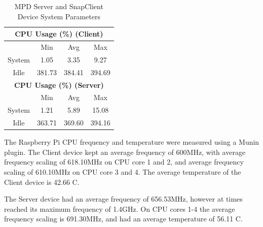 \documentclass[11pt,a4paper]{scrreprt}
\begin{document}
\begin{table}[H]
\begin{tabular}{||c|c|c|c|c|c|c||}
    \multicolumn{7}{|c|}{\textbf{CPU Usage (\%) (Client)}} \\
    \hline\hline
      & \multicolumn{2}{|c|}{Min} & \multicolumn{2}{|c|}{Avg} & \multicolumn{2}{|c|}{Max} \\
    \hline
    System & \multicolumn{2}{|c|}{1.05} & \multicolumn{2}{|c|}{3.35} & \multicolumn{2}{|c|}{9.27} \\
    \hline
    Idle & \multicolumn{2}{|c|}{381.73} & \multicolumn{2}{|c|}{384.41} & \multicolumn{2}{|c|}{394.69} \\
    \hline\hline
    \multicolumn{7}{|c|}{\textbf{CPU Usage (\%) (Server)}} \\
    \hline\hline
      & \multicolumn{2}{|c|}{Min} & \multicolumn{2}{|c|}{Avg} & \multicolumn{2}{|c|}{Max} \\
    \hline
    System & \multicolumn{2}{|c|}{1.21} & \multicolumn{2}{|c|}{5.89} & \multicolumn{2}{|c|}{15.08} \\
    \hline
    Idle & \multicolumn{2}{|c|}{363.71} & \multicolumn{2}{|c|}{369.60} & \multicolumn{2}{|c|}{394.16} \\
    \hline\hline
    \end{tabular}
    \caption{MPD Server and SnapClient Device System Parameters}
    \label{MPDclientserverSysTab}
\end{table}

The Raspberry Pi CPU frequency and temperature were measured using a
Munin plugin. The Client device kept an average frequency of 600MHz,
with average frequency scaling of 618.10MHz on CPU core 1 and 2, and
average frequency scaling of 610.10MHz on CPU core 3 and 4. The average
temperature of the Client device is 42.66 \degree C.

The Server device had an average frequency of 656.53MHz, however at
times reached its maximum frequency of 1.4GHz. On CPU cores 1-4 the
average frequency scaling is 691.30MHz, and had an average temperature
of 56.11 \degree C.
\end{document}
